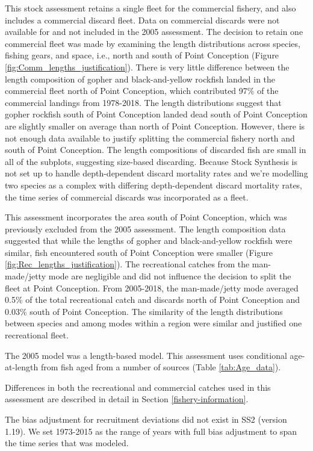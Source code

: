 \documentclass[12pt,]{article}
\begin{document}
This stock assessment retains a single fleet for the commercial fishery,
and also includes a commercial discard fleet. Data on commercial
discards were not available for and not included in the 2005 assessment.
The decision to retain one commercial fleet was made by examining the
length distributions across species, fishing gears, and space, i.e.,
north and south of Point Conception (Figure
\ref{fig:Comm_lengths_justification}). There is very little difference
between the length composition of gopher and black-and-yellow rockfish
landed in the commercial fleet north of Point Conception, which
contributed 97\% of the commercial landings from 1978-2018. The length
distributions suggest that gopher rockfish south of Point Conception
landed dead south of Point Conception are slightly smaller on average
than north of Point Conception. However, there is not enough data
available to justify splitting the commercial fishery north and south of
Point Conception. The length compositions of discarded fish are small in
all of the subplots, suggesting size-based discarding. Because Stock
Synthesis is not set up to handle depth-dependent discard mortality
rates and we're modelling two species as a complex with differing
depth-dependent discard mortality rates, the time series of commercial
discards was incorporated as a fleet.

This assessment incorporates the area south of Point Conception, which
was previously excluded from the 2005 assessment. The length composition
data suggested that while the lengths of gopher and black-and-yellow
rockfish were similar, fish encountered south of Point Conception were
smaller (Figure \ref{fig:Rec_lengths_justification}). The recreational
catches from the man-made/jetty mode are negligible and did not
influence the decision to split the fleet at Point Conception. From
2005-2018, the man-made/jetty mode averaged 0.5\% of the total
recreational catch and discards north of Point Conception and 0.03\%
south of Point Conception. The similarity of the length distributions
between species and among modes within a region were similar and
justified one recreational fleet.

The 2005 model was a length-based model. This assessment uses
conditional age-at-length from fish aged from a number of sources (Table
\ref{tab:Age_data}).

Differences in both the recreational and commercial catches used in this
assessment are described in detail in Section \ref{fishery-information}.

The bias adjustment for recruitment deviations did not exist in SS2
(version 1.19). We set 1973-2015 as the range of years with full bias
adjustment to span the time series that was modeled.
\end{document}
